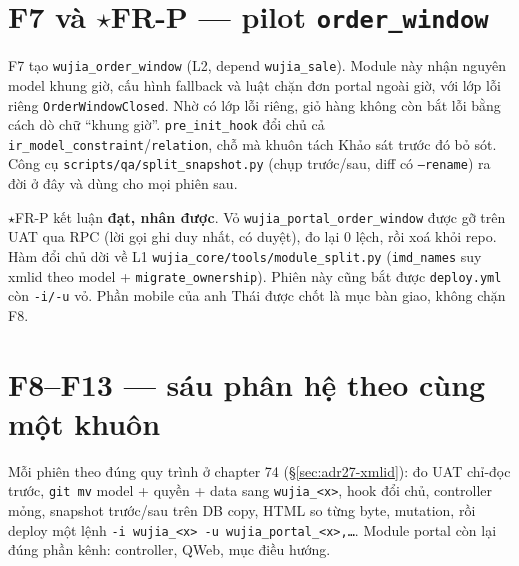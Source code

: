 \section{F7 và $\star$FR-P --- pilot \texttt{order\_window}}

F7 tạo \texttt{wujia\_order\_window} (L2, depend \texttt{wujia\_sale}). Module này nhận nguyên model khung giờ,
cấu hình fallback và luật chặn đơn portal ngoài giờ, với lớp lỗi riêng \texttt{OrderWindowClosed}. Nhờ có lớp
lỗi riêng, giỏ hàng không còn bắt lỗi bằng cách dò chữ ``khung giờ''. \texttt{pre\_init\_hook} đổi chủ cả
\texttt{ir\_model\_constraint}/\texttt{relation}, chỗ mà khuôn tách Khảo sát trước đó bỏ sót. Công cụ
\texttt{scripts/qa/split\_snapshot.py} (chụp trước/sau, diff có \texttt{--rename}) ra đời ở đây và dùng cho mọi phiên sau.

$\star$FR-P kết luận \textbf{đạt, nhân được}. Vỏ \texttt{wujia\_portal\_order\_window} được gỡ trên UAT qua RPC (lời gọi
ghi duy nhất, có duyệt), đo lại 0 lệch, rồi xoá khỏi repo. Hàm đổi chủ dời về L1
\texttt{wujia\_core/tools/module\_split.py} (\texttt{imd\_names} suy xmlid theo model + \texttt{migrate\_ownership}).
Phiên này cũng bắt được \texttt{deploy.yml} còn \texttt{-i/-u} vỏ. Phần mobile của anh Thái được chốt là mục bàn giao,
không chặn F8.

\section{F8--F13 --- sáu phân hệ theo cùng một khuôn}

Mỗi phiên theo đúng quy trình ở chapter 74 (\S\ref{sec:adr27-xmlid}): đo UAT chỉ-đọc trước, \texttt{git mv} model +
quyền + data sang \texttt{wujia\_<x>}, hook đổi chủ, controller mỏng, snapshot trước/sau trên DB copy, HTML so từng byte,
mutation, rồi deploy một lệnh \texttt{-i wujia\_<x> -u wujia\_portal\_<x>,\ldots}. Module portal còn lại đúng phần kênh:
controller, QWeb, mục điều hướng.

